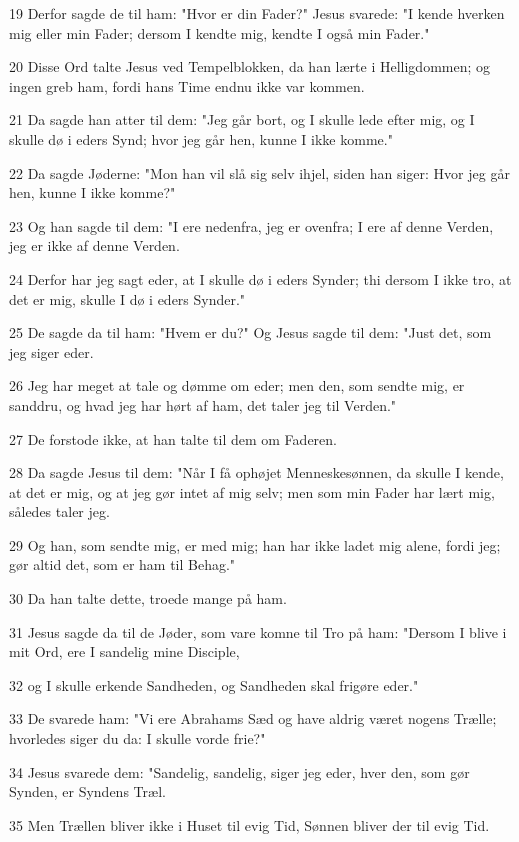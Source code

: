\par 19 Derfor sagde de til ham: "Hvor er din Fader?" Jesus svarede: "I kende hverken mig eller min Fader; dersom I kendte mig, kendte I også min Fader."
\par 20 Disse Ord talte Jesus ved Tempelblokken, da han lærte i Helligdommen; og ingen greb ham, fordi hans Time endnu ikke var kommen.
\par 21 Da sagde han atter til dem: "Jeg går bort, og I skulle lede efter mig, og I skulle dø i eders Synd; hvor jeg går hen, kunne I ikke komme."
\par 22 Da sagde Jøderne: "Mon han vil slå sig selv ihjel, siden han siger: Hvor jeg går hen, kunne I ikke komme?"
\par 23 Og han sagde til dem: "I ere nedenfra, jeg er ovenfra; I ere af denne Verden, jeg er ikke af denne Verden.
\par 24 Derfor har jeg sagt eder, at I skulle dø i eders Synder; thi dersom I ikke tro, at det er mig, skulle I dø i eders Synder."
\par 25 De sagde da til ham: "Hvem er du?" Og Jesus sagde til dem: "Just det, som jeg siger eder.
\par 26 Jeg har meget at tale og dømme om eder; men den, som sendte mig, er sanddru, og hvad jeg har hørt af ham, det taler jeg til Verden."
\par 27 De forstode ikke, at han talte til dem om Faderen.
\par 28 Da sagde Jesus til dem: "Når I få ophøjet Menneskesønnen, da skulle I kende, at det er mig, og at jeg gør intet af mig selv; men som min Fader har lært mig, således taler jeg.
\par 29 Og han, som sendte mig, er med mig; han har ikke ladet mig alene, fordi jeg; gør altid det, som er ham til Behag."
\par 30 Da han talte dette, troede mange på ham.
\par 31 Jesus sagde da til de Jøder, som vare komne til Tro på ham: "Dersom I blive i mit Ord, ere I sandelig mine Disciple,
\par 32 og I skulle erkende Sandheden, og Sandheden skal frigøre eder."
\par 33 De svarede ham: "Vi ere Abrahams Sæd og have aldrig været nogens Trælle; hvorledes siger du da: I skulle vorde frie?"
\par 34 Jesus svarede dem: "Sandelig, sandelig, siger jeg eder, hver den, som gør Synden, er Syndens Træl.
\par 35 Men Trællen bliver ikke i Huset til evig Tid, Sønnen bliver der til evig Tid.
